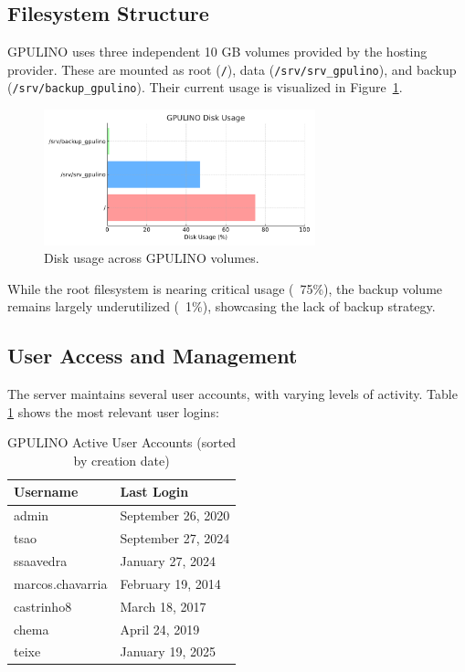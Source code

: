 \subsection{Filesystem Structure}

GPULINO uses three independent 10 GB volumes provided by the hosting provider. These are mounted as root (\verb|/|), data (\verb|/srv/srv_gpulino|), and backup (\verb|/srv/backup_gpulino|). Their current usage is visualized in Figure~\ref{fig:gpulino_disk_usage}.

\begin{figure}[H]
  \centering
  \includegraphics[width=0.7\textwidth]{figuras/gpulino_disk_usage.pdf}
  \caption{Disk usage across GPULINO volumes.}
  \label{fig:gpulino_disk_usage}
\end{figure}

While the root filesystem is nearing critical usage (~75\%), the backup volume remains largely underutilized (~1\%), showcasing the lack of backup strategy.

\subsection{User Access and Management}

The server maintains several user accounts, with varying levels of activity. Table \ref{tab:gpulino_users} shows the most relevant user logins:

\begin{table}[H]
  \centering
  \caption{GPULINO Active User Accounts (sorted by creation date)}
  \label{tab:gpulino_users}
  \begin{tabular}{ll}
    \rowcolor{udcpink!25}
    \textbf{Username} & \textbf{Last Login} \\
    \hline
    admin & September 26, 2020 \\
    tsao & September 27, 2024 \\
    ssaavedra & January 27, 2024 \\
    marcos.chavarria & February 19, 2014 \\
    castrinho8 & March 18, 2017 \\
    chema & April 24, 2019 \\
    teixe & January 19, 2025 \\
  \end{tabular}
\end{table}


